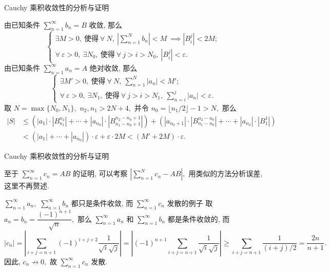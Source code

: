 
\begin{frame}{Cauchy 乘积收敛性的分析与证明}

由已知条件 $\sum\limits_{n=1}^\infty b_n = B$ 收敛, 那么
\[
\begin{cases}
\exists M > 0, ~ \text{使得} ~ \forall~N, ~ \left\lvert \sum\limits_{n=1}^N b_n \right\rvert < M ~ \implies \left\lvert B_i^j \right\rvert < 2M; \\
\forall~\varepsilon > 0, ~ \exists N_0, ~ \text{使得} ~ \forall~j > i > N_0, ~ \left\lvert B_i^j \right\rvert < \varepsilon.
\end{cases}
\]
\pause
由已知条件 $\sum\limits_{n=1}^\infty a_n = A$ 绝对收敛, 那么
\[
\begin{cases}
\exists M' > 0, ~ \text{使得} ~ \forall~N, ~ \sum\limits_{n=1}^N |a_n| < M'; \\
\forall~\varepsilon > 0, ~ \exists N_1, ~ \text{使得} ~ \forall~j > i > N_1, ~ \sum\limits_{n=i}^j |a_n| < \varepsilon.
\end{cases}
\]
\pause
取 $N = \max\{N_0, N_1\},$ $n_2, n_1 > 2N + 4,$ 并令 $n_0 = \lfloor n_1 / 2 \rfloor - 1 > N,$ 那么
\begin{align*}
|S| & \leqslant \left( |a_1| \cdot |B_{n_1}^{n_2}| + \cdots + |a_{n_0}| \cdot |B_{n_1-n_0+1}^{n_2-n_0+1}| \right) + \left( |a_{n_0+1}| \cdot |B_{n_1-n_0}^{n_2-n_0}| + \cdots + |a_{n_2}| \cdot |B_1^1| \right) \\
& < (|a_1| + \cdots + |a_{n_0}|) \cdot \varepsilon + \varepsilon \cdot 2M < (M' + 2M) \cdot \varepsilon.
\end{align*}

\end{frame}


\begin{frame}{Cauchy 乘积收敛性的分析与证明}

\begin{remark}
至于 $\sum\limits_{n=1}^\infty c_n = AB$ 的证明, 可以考察 $\left\lvert \sum\limits_{n=1}^N c_n - AB \right\rvert,$ 用类似的方法分析误差, 这里不再赘述.
\end{remark}

\pause

\begin{block}{$\sum\limits_{n=1}^\infty a_n,$ $\sum\limits_{n=1}^\infty b_n$ 都只是条件收敛, 而 $\sum\limits_{n=1}^\infty c_n$ 发散的例子}
取 $a_n = b_n = \dfrac{(-1)^{n+1}}{\sqrt{n}},$ 那么 $\sum\limits_{n=1}^\infty a_n$ 和 $\sum\limits_{n=1}^\infty b_n$ 都是条件收敛的, 而
\[
|c_n| = \left|\sum_{i+j=n+1} (-1)^{i+j+2} \dfrac{1}{\sqrt{i}\sqrt{j}}\right| = \left|(-1)^{n+1} \sum_{i+j=n+1} \dfrac{1}{\sqrt{i}\sqrt{j}}\right| \geqslant \sum_{i+j=n+1} \dfrac{1}{(i + j)/2} = \dfrac{2n}{n+1}.
\]
因此, $c_n \not\to 0,$ 故 $\sum\limits_{n=1}^\infty c_n$ 发散.
\end{block}

\end{frame}

